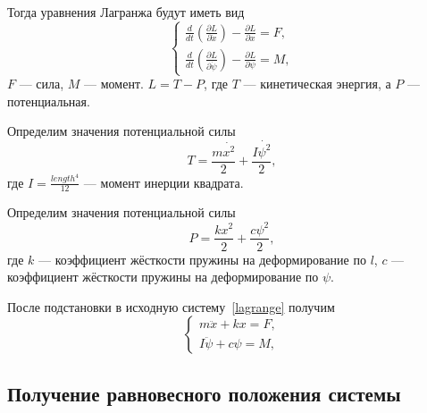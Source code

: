 \documentclass[a4paper,14pt]{extarticle}
\begin{document}
Тогда уравнения Лагранжа будут иметь вид
\begin{equation}
	\begin{cases*}
	\frac{d}{dt} \left(\frac{\partial L}{\partial \dot{x}} \right) - \frac{\partial L}{\partial x} = F, \\
	\frac{d}{dt} \left(\frac{\partial L}{\partial \dot{\psi}} \right) - \frac{\partial L}{\partial \psi} = M,
	\end{cases*}
\label{lagrange}
\end{equation}
$F$ --- сила, $M$ --- момент. $L =  T - P$, где $T$ --- кинетическая энергия, а $P$ --- потенциальная.

\noindent Определим значения потенциальной силы
\begin{equation*}
	T = \frac{m \dot{x^2}}{2} + \frac{I \dot{\psi^2}}{2},
\end{equation*}
где $I = \frac{length^4}{12}$ --- момент инерции квадрата.

\noindent Определим значения потенциальной силы
\begin{equation*}
	P = \frac{k {x^2}}{2} +\frac{c {\psi^2}}{2},
\end{equation*}
где $k$ --- коэффициент жёсткости пружины на деформирование по $l$,  $c$ --- коэффициент жёсткости пружины на деформирование по $\psi$.

После подстановки в исходную систему~\eqref{lagrange} получим
\begin{equation}
	\begin{cases*}
		m \ddot{x} + k x = F, \\
		I \ddot{\psi} + c \psi = M,
	\end{cases*}
	\label{lagrange_fin}
\end{equation}

\subsection{Получение равновесного положения системы}
\end{document}
